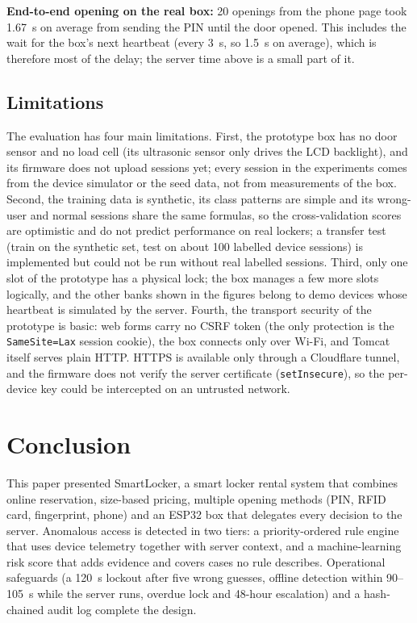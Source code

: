 \documentclass[conference, onecolumn]{IEEEtran}
\begin{document}
\textbf{End-to-end opening on the real box:} 20 openings from the phone page took 1.67~s on average from sending
the PIN until the door opened. This includes the wait for the box's next heartbeat (every 3~s, so 1.5~s on average),
which is therefore most of the delay; the server time above is a small part of it.

\subsection{Limitations}

The evaluation has four main limitations. First, the prototype box has no door sensor and no load cell (its ultrasonic
sensor only drives the LCD backlight), and its firmware does not upload sessions yet; every session in the experiments
comes from the device simulator or the seed data, not from measurements of the box. Second, the training data is
synthetic, its class patterns are simple and its wrong-user and normal sessions share the same formulas, so the
cross-validation scores are optimistic and do not predict performance on real lockers; a transfer test (train on the
synthetic set, test on about 100 labelled device sessions) is implemented but could not be run without real labelled
sessions. Third, only one slot of the prototype has a physical lock; the box manages a few more slots
logically, and the other banks shown in the figures belong to demo devices whose heartbeat is simulated by the server.
Fourth, the transport security of the prototype is basic: web forms carry no CSRF token (the only protection is the
\texttt{SameSite=Lax} session cookie), the box connects only over Wi-Fi, and Tomcat itself serves plain HTTP. HTTPS is
available only through a Cloudflare tunnel, and the firmware does not verify the server certificate
(\texttt{setInsecure}), so the per-device key could be intercepted on an untrusted network.

\section{Conclusion}

This paper presented SmartLocker, a smart locker rental system that combines online reservation, size-based pricing,
multiple opening methods (PIN, RFID card, fingerprint, phone) and an ESP32 box that delegates every decision to the
server. Anomalous access is detected in two tiers: a priority-ordered rule engine that uses device telemetry together
with server context, and a machine-learning risk score that adds evidence and covers cases no rule describes.
Operational safeguards (a 120~s lockout after five wrong guesses, offline detection within 90--105~s while the server
runs, overdue lock and 48-hour escalation) and a hash-chained audit log complete the design.
\end{document}
